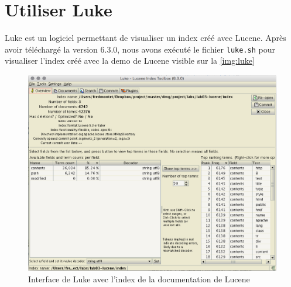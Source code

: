 \chapter{Utiliser Luke}

Luke est un logiciel permettant de visualiser un index créé avec Lucene. Après avoir téléchargé la version 6.3.0, nous avons exécuté le fichier \texttt{luke.sh} pour visualiser l’index créé avec la demo de Lucene visible sur la \autoref{img:luke}

\begin{figure}[H]
    \centering
    \includegraphics[width=0.7\linewidth, fbox]{img/luke.png}
    \caption{Interface de Luke avec l'index de la documentation de Lucene}
    \label{img:luke}
\end{figure}
